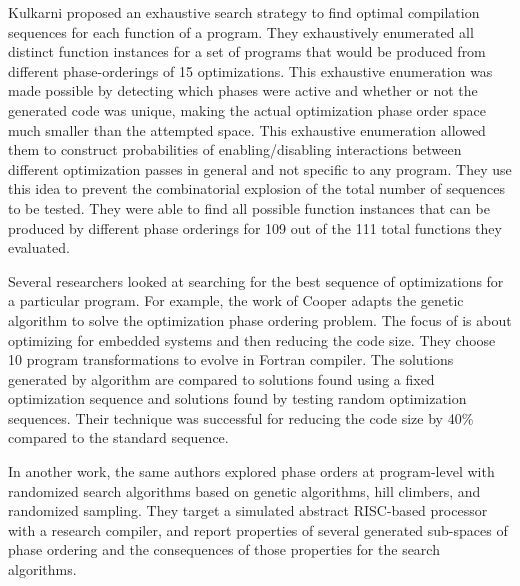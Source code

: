 Kulkarni \etal\cite{kulkarni2009practical,kulkarni2006exhaustive} proposed an exhaustive search strategy to find optimal compilation sequences for each function of a program. They exhaustively enumerated all distinct function instances for a set of programs that would be produced from different phase-orderings of 15 optimizations. This exhaustive enumeration was made possible by detecting which phases were active and whether or not the generated code was unique, making the actual optimization phase order space much smaller than the attempted space. This exhaustive enumeration allowed them to construct probabilities of enabling/disabling interactions between different optimization passes in general and not specific to any program. They use this idea to prevent the combinatorial explosion of the total number of sequences to be tested. 
They were able to find all possible function instances that can be produced by different phase orderings for 109 out of the 111 total functions they evaluated.


Several researchers looked at searching for the best sequence of optimizations for a particular program. For example, the work of Cooper \etal\cite{cooper1999optimizing} adapts the genetic algorithm to solve the optimization phase ordering problem. The focus of  is about optimizing for embedded systems and then reducing the code size. They choose 10 program transformations to evolve in Fortran compiler. The solutions generated by  algorithm are compared to solutions found using a fixed optimization sequence and solutions found by testing random optimization sequences. Their technique was successful for reducing the code size by 40\% compared to the standard sequence.

In another work\cite{cooper2006exploring}, the same authors explored phase orders at program-level with randomized search algorithms based on genetic algorithms, hill climbers, and randomized sampling. They target a simulated abstract RISC-based processor with a research compiler, and report properties of several generated sub-spaces of phase ordering and the consequences of those properties for the search algorithms.

